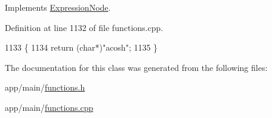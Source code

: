Implements \hyperlink{classExpressionNode_a42a5e9562b0f645a19dcc83f698069b5}{Expression\+Node}.



Definition at line 1132 of file functions.\+cpp.


\begin{DoxyCode}
1133 \{
1134     \textcolor{keywordflow}{return} (\textcolor{keywordtype}{char}*)\textcolor{stringliteral}{"acosh"};
1135 \}
\end{DoxyCode}


The documentation for this class was generated from the following files\+:\begin{DoxyCompactItemize}
\item 
app/main/\hyperlink{functions_8h}{functions.\+h}\item 
app/main/\hyperlink{functions_8cpp}{functions.\+cpp}\end{DoxyCompactItemize}
